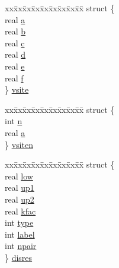 \begin{DoxyCompactItemize}
\begin{tabbing}
\end{tabbing}\item 
\begin{tabbing}
xx\=xx\=xx\=xx\=xx\=xx\=xx\=xx\=xx\=\kill
struct \{\\
\>real \hyperlink{uniont__iparams_a070fd67041cc597a6c1ec5efeee18969}{a}\\
\>real \hyperlink{uniont__iparams_aecf26369e3ec0909a09fe8be715e3a0e}{b}\\
\>real \hyperlink{uniont__iparams_a6f12f82807f6b417c8982bbb5a27af83}{c}\\
\>real \hyperlink{uniont__iparams_a233be3a35ee344b243f12850d7e318d9}{d}\\
\>real \hyperlink{uniont__iparams_a0283e709a03890532a41c90f84f7a6ef}{e}\\
\>real \hyperlink{uniont__iparams_af3e2f5b7d6e4ab79c0dd82bb30e4973d}{f}\\
\} \hyperlink{uniont__iparams_a073f14827f827d1afef46794979e4330}{vsite}\\

\end{tabbing}\item 
\begin{tabbing}
xx\=xx\=xx\=xx\=xx\=xx\=xx\=xx\=xx\=\kill
struct \{\\
\>int \hyperlink{uniont__iparams_a7c93c2d86d448c4acd9c859248cf2824}{n}\\
\>real \hyperlink{uniont__iparams_a070fd67041cc597a6c1ec5efeee18969}{a}\\
\} \hyperlink{uniont__iparams_a79f10746ca05449c52281f56a37652c7}{vsiten}\\

\end{tabbing}\item 
\begin{tabbing}
xx\=xx\=xx\=xx\=xx\=xx\=xx\=xx\=xx\=\kill
struct \{\\
\>real \hyperlink{uniont__iparams_a1a801882e53b5b93a2677663c3cd24cb}{low}\\
\>real \hyperlink{uniont__iparams_aefd97a29531a82503fba6ec4f1e06106}{up1}\\
\>real \hyperlink{uniont__iparams_aa473de5ff349c007f41bc91c5f60a51a}{up2}\\
\>real \hyperlink{uniont__iparams_aa2047a1076195f900b14c9a5fbc12c85}{kfac}\\
\>int \hyperlink{uniont__iparams_aba49a0499479c9556a82f7a4a4684f05}{type}\\
\>int \hyperlink{uniont__iparams_a1c14cb25db59e5658ce18ce068c5cdf4}{label}\\
\>int \hyperlink{uniont__iparams_a2c83583eb09d3b602bb96c51e1cc7423}{npair}\\
\} \hyperlink{uniont__iparams_a1f16bcebfb60f09cd8653da30464c0da}{disres}\\


\end{tabbing}
\end{DoxyCompactItemize}
